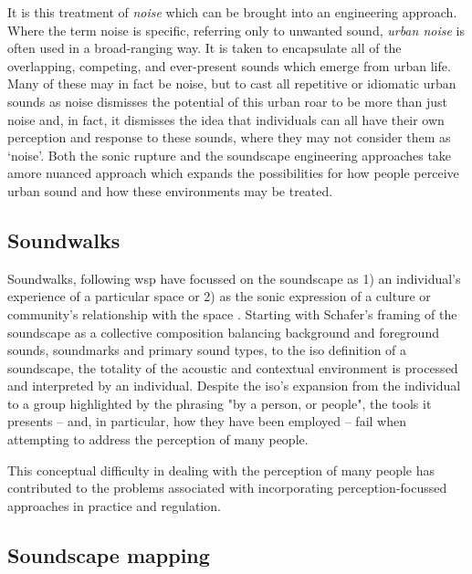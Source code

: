 It is this treatment of \emph{noise} which can be brought into an engineering approach. Where the term noise is specific, referring only to unwanted sound, \emph{urban noise} is often used in a broad-ranging way. It is taken to encapsulate all of the overlapping, competing, and ever-present sounds which emerge from urban life. Many of these may in fact be noise, but to cast all repetitive or idiomatic urban sounds as noise dismisses the potential of this urban roar to be more than just noise and, in fact, it dismisses the idea that individuals can all have their own perception and response to these sounds, where they may not consider them as `noise'. Both the sonic rupture and the soundscape engineering approaches take amore nuanced approach which expands the possibilities for how people perceive urban sound and how these environments may be treated.


\subsection{Soundwalks}
Soundwalks, following \gls{wsp} have focussed on the soundscape as 1) an individual's experience of a particular space or 2) as the sonic expression of a culture or community's relationship with the space \citep{Droumeva2021sound}. Starting with Schafer's framing of the soundscape as a collective composition balancing background and foreground sounds, soundmarks and primary sound types, to the \gls{iso} definition of a soundscape, the totality of the acoustic and contextual environment is processed and interpreted by an individual. Despite the \gls{iso}'s expansion from the individual to a group highlighted by the phrasing "by a person, or people", the tools it presents -- and, in particular, how they have been employed -- fail when attempting to address the perception of many people.

This conceptual difficulty in dealing with the perception of many people has contributed to the problems associated with incorporating perception-focussed approaches in practice and regulation.  %

\subsection{Soundscape mapping}

